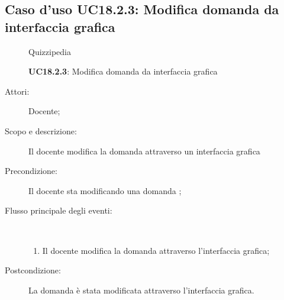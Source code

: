 \subsection{Caso d'uso UC18.2.3: Modifica domanda da interfaccia grafica}
	\begin{figure}[H]
		\centering
		\begin{resizedtikzpicture}{\textwidth}
		\begin{umlsystem}[x=0, fill=lightgray!20]{Quizzipedia}
		\end{umlsystem}
		\end{resizedtikzpicture}
		\caption{\textbf{UC18.2.3}: Modifica domanda da interfaccia grafica}
		\label{UC18.2.3}
	\end{figure}
\begin{description}
\item[Attori:] Docente;
\item[Scopo e descrizione:] Il docente modifica la domanda attraverso un interfaccia grafica

      \item[Precondizione:] Il docente sta modificando una domanda
;

        \item[Flusso principale degli eventi:] \ 
 \begin{enumerate}
          \item Il docente modifica la domanda attraverso l'interfaccia grafica;

      \end{enumerate}
    \item[Postcondizione:] La domanda è stata modificata attraverso l'interfaccia grafica.
  \end{description}
\hypertarget{UC18.3}{}
